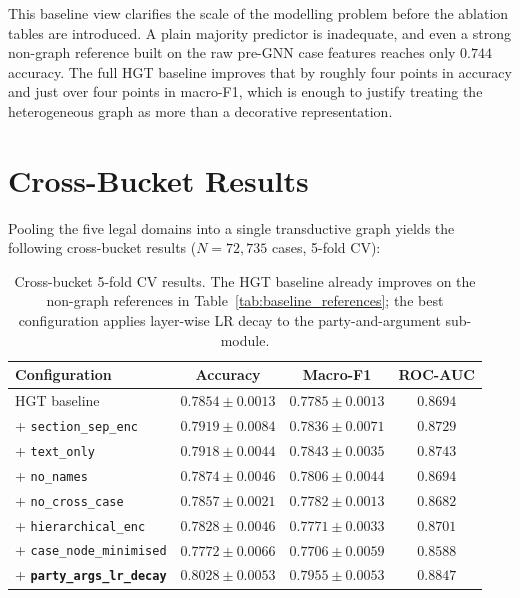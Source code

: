 {\color{blue}This baseline view clarifies the scale of the modelling
problem before the ablation tables are introduced. A plain majority
predictor is inadequate, and even a strong non-graph reference built on
the raw pre-GNN case features reaches only $0.744$ accuracy. The full
HGT baseline improves that by roughly four points in accuracy and just
over four points in macro-F1, which is enough to justify treating the
heterogeneous graph as more than a decorative representation.\par}

\section{Cross-Bucket Results}
\label{sec:main_results}

Pooling the five legal domains into a single transductive graph yields
the following cross-bucket results ($N\!=\!72{,}735$ cases, 5-fold CV):

\begin{table}[H]
  \centering
  \small
  \begin{tabular}{lccc}
    \toprule
    Configuration & Accuracy & Macro-F1 & ROC-AUC \\
    \midrule
    HGT baseline                      & $0.7854\pm0.0013$ & $0.7785\pm0.0013$ & $0.8694$ \\
    + \texttt{section\_sep\_enc}      & $0.7919\pm0.0084$ & $0.7836\pm0.0071$ & $0.8729$ \\
    + \texttt{text\_only}             & $0.7918\pm0.0044$ & $0.7843\pm0.0035$ & $0.8743$ \\
    + \texttt{no\_names}              & $0.7874\pm0.0046$ & $0.7806\pm0.0044$ & $0.8694$ \\
    + \texttt{no\_cross\_case}        & $0.7857\pm0.0021$ & $0.7782\pm0.0013$ & $0.8682$ \\
    + \texttt{hierarchical\_enc}      & $0.7828\pm0.0046$ & $0.7771\pm0.0033$ & $0.8701$ \\
    + \texttt{case\_node\_minimised}  & $0.7772\pm0.0066$ & $0.7706\pm0.0059$ & $0.8588$ \\
    \midrule
    + \textbf{\texttt{party\_args\_lr\_decay}} & $\mathbf{0.8028\pm0.0053}$ &
      $\mathbf{0.7955\pm0.0053}$ & $\mathbf{0.8847}$ \\
    \bottomrule
  \end{tabular}
  \caption{Cross-bucket 5-fold CV results. The HGT baseline already
  improves on the non-graph references in
  Table~\ref{tab:baseline_references}; the best configuration applies
  layer-wise LR decay to the party-and-argument sub-module.}
  \label{tab:cross_bucket_results}
\end{table}

